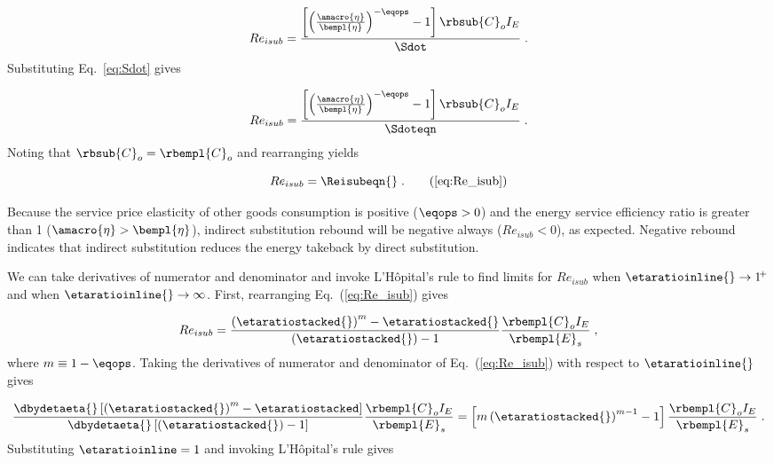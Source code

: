 \begin{equation}
  Re_{isub} = \frac{\left[ \left( \frac{\amacro{\eta}}{\bempl{\eta}} \right)^{-\eqops} - 1  \right] \rbsub{C}_o I_E} {\Sdot} \; .
\end{equation}
%
Substituting Eq.~\ref{eq:Sdot} gives

\begin{equation}
  Re_{isub} = \frac{\left[ \left(\frac{\amacro{\eta}}{\bempl{\eta}} \right)
                  ^{-\eqops} - 1  \right] \rbsub{C}_o I_E}
                  {\Sdoteqn} \; .
\end{equation}
%
Noting that $\rbsub{C}_o = \rbempl{C}_o$ and rearranging yields

\begin{equation}
  Re_{isub} = \Reisubeqn{} \; . \tag{\ref{eq:Re_isub}}
\end{equation}

Because the service price elasticity of other goods consumption is positive ($\eqops > 0$) and
the energy service efficiency ratio is greater than 1 ($\amacro{\eta} > \bempl{\eta}$),
indirect substitution rebound will be negative always ($Re_{isub} < 0$),
as expected.
Negative rebound indicates that indirect substitution reduces the energy takeback by direct substitution.

We can take derivatives of numerator and denominator and
invoke L'H\^{o}pital's rule
to find limits for $Re_{isub}$ when
$\etaratioinline{} \to 1^{\! +}$ and when
$\etaratioinline{} \to \infty$.
First, rearranging Eq.~(\ref{eq:Re_isub}) gives

\begin{equation}
  Re_{isub} = \frac{\left( \etaratiostacked{} \right)^m - \etaratiostacked{}}{\left( \etaratiostacked{} \right) - 1} \frac{\rbempl{C}_o I_E}{\rbempl{E}_s} \; ,
\end{equation}
%
where $m \equiv 1 - \eqops$.
Taking the derivatives of numerator and denominator of Eq.~(\ref{eq:Re_isub})
with respect to $\etaratioinline{}$ gives

\begin{equation}
  \frac{\dbydetaeta{} \left[ \left( \etaratiostacked{} \right)^m - \etaratiostacked \right]}
            {\dbydetaeta{}\left[ \left( \etaratiostacked{} \right)  - 1 \right] } \frac{\rbempl{C}_o I_E}{\rbempl{E}_s} 
       = \left[ m \left( \etaratiostacked{} \right)^{m-1} - 1 \right] \frac{\rbempl{C}_o I_E}{\rbempl{E}_s} \; .
\end{equation}
%
Substituting $\etaratioinline = 1$ and invoking L'H\^{o}pital's rule gives

